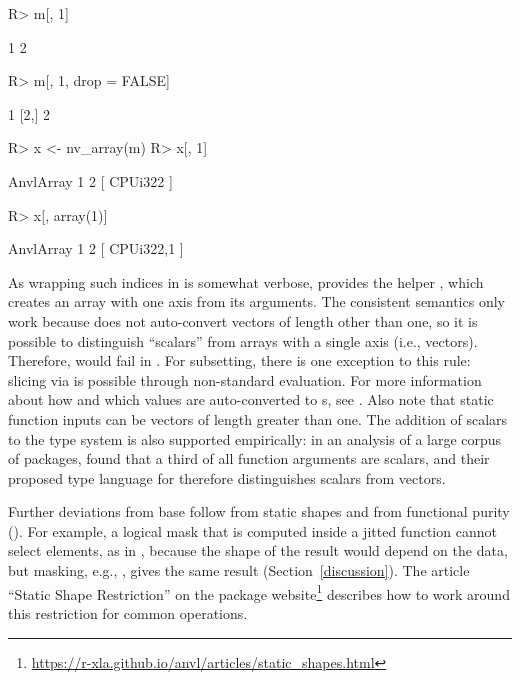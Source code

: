 \documentclass[article,shortnames]{jss}
\renewenvironment{CodeChunk}{\par\addvspace{0.6\baselineskip}\noindent\begin{minipage}{\linewidth}}{\end{minipage}\par\vspace{0.6\baselineskip}}
\begin{document}
\begin{CodeChunk}
\begin{CodeInput}
R> m[, 1]
\end{CodeInput}
\begin{CodeOutput}
[1] 1 2
\end{CodeOutput}
\begin{CodeInput}
R> m[, 1, drop = FALSE]
\end{CodeInput}
\begin{CodeOutput}
     [,1]
[1,]    1
[2,]    2
\end{CodeOutput}
\begin{CodeInput}
R> x <- nv_array(m)
R> x[, 1]
\end{CodeInput}
\begin{CodeOutput}
AnvlArray
 1
 2
[ CPUi32{2} ]
\end{CodeOutput}
\begin{CodeInput}
R> x[, array(1)]
\end{CodeInput}
\begin{CodeOutput}
AnvlArray
 1
 2
[ CPUi32{2,1} ]
\end{CodeOutput}
\end{CodeChunk}

As wrapping such indices in  is somewhat verbose,  provides the helper , which creates an  array with one axis from its arguments.
The consistent semantics only work because  does not auto-convert  vectors of length other than one, so it is possible to distinguish ``scalars'' from arrays with a single axis (i.e., vectors).
Therefore,  would fail in .
For subsetting, there is one exception to this rule: slicing via  is possible through non-standard evaluation.
For more information about how and which  values are auto-converted to s, see .
Also note that static function inputs can be vectors of length greater than one.
The addition of scalars to the type system is also supported empirically: in an analysis of a large corpus of  packages, \citet{ref-turcotte2020types} found that a third of all function arguments are scalars, and their proposed type language for  therefore distinguishes scalars from vectors.

Further deviations from base  follow from static shapes and from functional purity ().
For example, a logical mask that is computed inside a jitted function cannot select elements, as in , because the shape of the result would depend on the data, but masking, e.g., , gives the same result (Section~\ref{discussion}).
The article ``Static Shape Restriction'' on the package website\footnote{\url{https://r-xla.github.io/anvl/articles/static_shapes.html}} describes how to work around this restriction for common operations.
\end{document}
